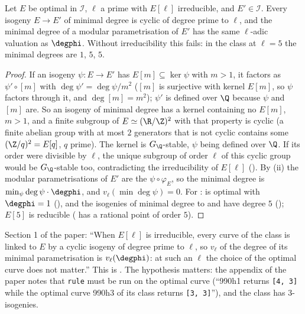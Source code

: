 \begin{proposition}\label{prop:moddeg:valuation-in-class}
Let $E$ be optimal in $\mathcal I$, $\ell$ a prime with $E[\ell]$ irreducible, and $E'\in\mathcal I$. Every isogeny $E\to E'$ of minimal degree is cyclic of degree prime to $\ell$, and the
minimal degree of a modular parametrisation of $E'$ has the same $\ell$-adic valuation as $\degphi$. Without irreducibility this fails: in the class  at $\ell=5$ the minimal
degrees are $1$, $5$, $5$.
\end{proposition}

\begin{proof}
If an isogeny $\psi\colon E\to E'$ has $E[m]\subseteq\ker\psi$ with $m>1$, it factors as $\psi'\circ[m]$ with $\deg\psi'=\deg\psi/m^2$ ($[m]$ is surjective with kernel $E[m]$, so
$\psi$ factors through it, and $\deg[m]=m^2$); $\psi'$ is defined over $\Q$ because $\psi$ and $[m]$ are. So an isogeny of minimal degree has a kernel containing no $E[m]$, $m>1$,
and a finite subgroup of $E\simeq(\R/\Z)^2$ with that property is cyclic (a finite abelian group with at most $2$ generators that is not cyclic contains some $(\Z/q)^2=E[q]$, $q$ prime). The
kernel is $G_\Q$-stable, $\psi$ being defined over $\Q$. If its order were divisible by $\ell$, the unique subgroup of order $\ell$ of this cyclic group would be $G_\Q$-stable too, contradicting the
irreducibility of $E[\ell]$ (). By
(ii) the modular parametrisations of $E'$ are the $\psi\circ\varphi_E$, so the minimal degree is $\min_\psi\deg\psi\cdot\degphi$, and $v_\ell(\min\deg\psi)=0$. For
:  is optimal with $\degphi=1$ (), and the isogenies of minimal degree to  and  have degree $5$
(); $E[5]$ is reducible ( has a rational point of order $5$).
\end{proof}

\begin{paperlink}\label{pl:moddeg:class-choice}
Section 1 of the paper: ``When $E[\ell]$ is irreducible, every curve of the class is linked to $E$ by a cyclic isogeny of degree prime to $\ell$, so $v_\ell$ of the degree of its
minimal parametrisation is $v_\ell(\degphi)$: at such an $\ell$ the choice of the optimal curve does not matter.'' This is . The hypothesis
matters: the appendix of the paper notes that \texttt{rule} must be run on the optimal curve (``990h1 returns \texttt{[4, 3]} while the optimal curve 990h3 of its class returns
\texttt{[3, 3]}''), and the class  has $3$-isogenies.
\end{paperlink}

